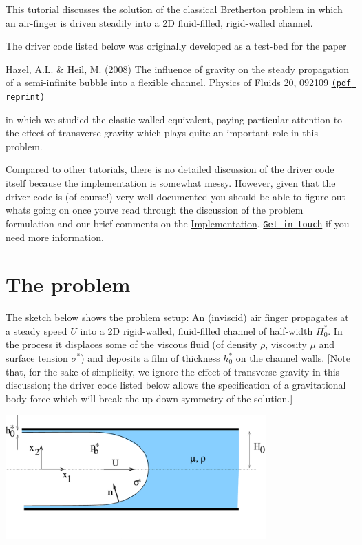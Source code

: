 This tutorial discusses the solution of the classical Bretherton problem in which an air-\/finger is driven steadily into a 2D fluid-\/filled, rigid-\/walled channel.

The driver code listed below was originally developed as a test-\/bed for the paper

\begin{center} Hazel, A.\+L. \& Heil, M. (2008) The influence of gravity on the steady propagation of a semi-\/infinite bubble into a flexible channel. Physics of Fluids 20, 092109 \href{http://www.maths.manchester.ac.uk/~mheil/MATTHIAS/PDF/HazelHeilPoF2008.pdf}{\tt (pdf reprint)} \end{center} 

in which we studied the elastic-\/walled equivalent, paying particular attention to the effect of transverse gravity which plays quite an important role in this problem.

Compared to other tutorials, there is no detailed discussion of the driver code itself because the implementation is somewhat messy. However, given that the driver code is (of course!) very well documented you should be able to figure out what\textquotesingle{}s going on once you\textquotesingle{}ve read through the discussion of the problem formulation and our brief comments on the \hyperlink{index_implement}{Implementation}. \href{../../../contact/html/index.html}{\tt Get in touch} if you need more information.\hypertarget{index_problem}{}\section{The problem}\label{index_problem}
The sketch below shows the problem setup\+: An (inviscid) air finger propagates at a steady speed $ U $ into a 2D rigid-\/walled, fluid-\/filled channel of half-\/width $ H_0^* $. In the process it displaces some of the viscous fluid (of density $ \rho $, viscosity $ \mu $ and surface tension $ \sigma^* $) and deposits a film of thickness $ h_0^* $ on the channel walls. \mbox{[}Note that, for the sake of simplicity, we ignore the effect of transverse gravity in this discussion; the driver code listed below allows the specification of a gravitational body force which will break the up-\/down symmetry of the solution.\mbox{]}

 
\begin{DoxyImage}
\includegraphics[width=0.75\textwidth]{bretherton_sketch}
\end{DoxyImage}


